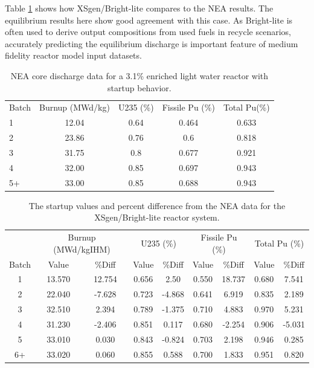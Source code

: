 \documentclass{article}
\begin{document}
Table \ref{tab:b} shows how XSgen/Bright-lite compares to the NEA results.
The equilibrium results here show good agreement with this case. As Bright-lite is often
used to derive output compositions from used fuels in recycle scenarios, accurately
predicting the equilibrium discharge is important feature of medium fidelity reactor model
input datasets.

\begin{table}[!htb]
\centering
\caption{NEA core discharge data for a 3.1\% enriched light water reactor with startup behavior.}
\label{tab:b}
\begin{tabular}{lcccc}
Batch & Burnup (MWd/kg) & U235 (\%) & Fissile Pu (\%) & Total Pu(\%) \\
1 & 12.04 & 0.64 & 0.464 & 0.633 \\
2 & 23.86 & 0.76 & 0.6 & 0.818 \\
3 & 31.75 & 0.8 & 0.677 & 0.921 \\
4 & 32.00 & 0.85 & 0.697 & 0.943 \\
5+ & 33.00 & 0.85 & 0.688 & 0.943
\end{tabular}
\end{table}

\begin{table}[!htb]
\centering
\caption{The startup values and percent difference from the NEA data for the XSgen/Bright-lite reactor system.}
\label{tab:c}
\begin{tabular}{c cc | cc | cc | cc}
 & \multicolumn{2}{p{1cm}}{Burnup (MWd/kgIHM)} & \multicolumn{2}{c}{U235 (\%)} & \multicolumn{2}{c}{Fissile Pu (\%)} & \multicolumn{2}{c}{Total Pu (\%)} \\
Batch & Value & \%Diff & Value & \%Diff & Value & \%Diff & Value & \%Diff \\
1 & 13.570 & 12.754 & 0.656 & 2.50 & 0.550 & 18.737 & 0.680 & 7.541 \\
2 & 22.040 & -7.628 & 0.723 & -4.868 & 0.641 & 6.919 & 0.835 & 2.189 \\
3 & 32.510 & 2.394 & 0.789 & -1.375 & 0.710 & 4.883 & 0.970 & 5.231 \\
4 & 31.230 & -2.406 & 0.851 & 0.117 & 0.680 & -2.254 & 0.906 & -5.031 \\
5 & 33.010 & 0.030 & 0.843 & -0.824 & 0.703 & 2.198 & 0.946 & 0.285 \\
6+ & 33.020 & 0.060 & 0.855 & 0.588 & 0.700 & 1.833 & 0.951 & 0.820
\end{tabular}
\end{table}
\end{document}
